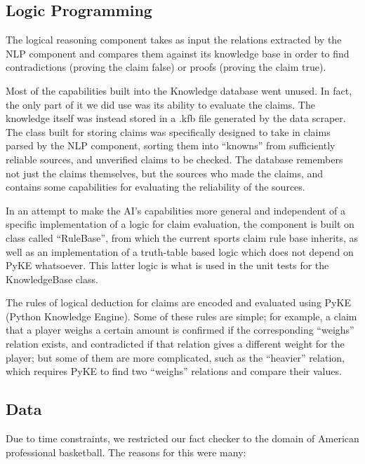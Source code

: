\documentclass{chi2009}
\begin{document}
\subsection{Logic Programming}

The logical reasoning component takes as input the relations extracted by the NLP component and compares them against its knowledge base in order to find contradictions (proving the claim false) or proofs (proving the claim true).

Most of the capabilities built into the Knowledge database went unused.
In fact, the only part of it we did use was its ability to evaluate the claims. The knowledge itself was instead stored in a .kfb file generated by the data scraper.
The class built for storing claims was specifically designed to take in claims parsed by the NLP component, sorting them into ``knowns'' from sufficiently reliable sources, and unverified claims to be checked.
The database remembers not just the claims themselves, but the sources who made the claims, and contains some capabilities for evaluating the reliability of the sources. 

In an attempt to make the AI's capabilities more general and independent of a specific implementation of a logic for claim evaluation, the component is built on class called ``RuleBase'', from which the current sports claim rule base inherits, as well as an implementation of a truth-table based logic which does not depend on PyKE whatsoever. This latter logic is what is used in the unit tests for the KnowledgeBase class.

The rules of logical deduction for claims are encoded and evaluated using PyKE (Python Knowledge Engine). \cite{PyKE}
Some of these rules are simple;
for example, a claim that a player weighs a certain amount is confirmed if the corresponding ``weighs'' relation exists, and contradicted if that relation gives a different weight for the player;
but some of them are more complicated, such as the ``heavier'' relation, which requires PyKE to find two ``weighs'' relations and compare their values.

\subsection{Data}
Due to time constraints, we restricted our fact checker to the domain of American professional basketball.  The reasons for this were many:
\end{document}
